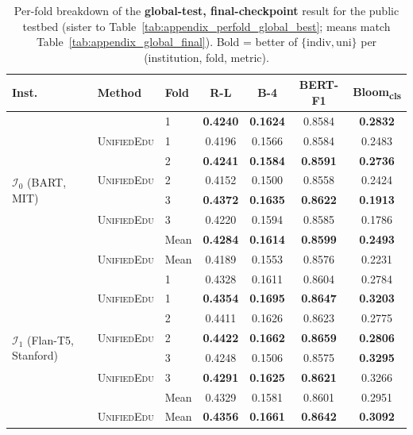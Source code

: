 \documentclass[11pt]{article}
\theoremstyle{plain}
\theoremstyle{definition}
\theoremstyle{remark}
\newcommand{\UniEdu}{\textsc{UnifiedEdu}}
\newcommand{\indiv}{\text{indiv}}
\newcommand{\uni}{\text{uni}}
\begin{document}
\begin{table}[t]
\centering
\footnotesize
\setlength{\tabcolsep}{3pt}
\caption{Per-fold breakdown of the
\textbf{global-test, final-checkpoint} result for
the public testbed (sister to
Table~\ref{tab:appendix_perfold_global_best}; means
match Table~\ref{tab:appendix_global_final}). Bold =
better of $\{\indiv, \uni\}$ per (institution, fold,
metric).}
\label{tab:appendix_perfold_global_final}
\begin{tabular}{ll l cccc}
\toprule
\textbf{Inst.} & \textbf{Method} & \textbf{Fold} &
\textbf{R-L} & \textbf{B-4} & \textbf{BERT-F1} & \textbf{Bloom\textsubscript{cls}} \\
\midrule
\multirow{8}{*}{$\mathcal{I}_0$ (BART, MIT)}
  & \indiv    & 1     & \textbf{0.4240} & \textbf{0.1624} & 0.8584 & \textbf{0.2832} \\
  & \UniEdu{} & 1     & 0.4196 & 0.1566 & 0.8584 & 0.2483 \\
  & \indiv    & 2     & \textbf{0.4241} & \textbf{0.1584} & \textbf{0.8591} & \textbf{0.2736} \\
  & \UniEdu{} & 2     & 0.4152 & 0.1500 & 0.8558 & 0.2424 \\
  & \indiv    & 3     & \textbf{0.4372} & \textbf{0.1635} & \textbf{0.8622} & \textbf{0.1913} \\
  & \UniEdu{} & 3     & 0.4220 & 0.1594 & 0.8585 & 0.1786 \\
  & \indiv    & Mean  & \textbf{0.4284} & \textbf{0.1614} & \textbf{0.8599} & \textbf{0.2493} \\
  & \UniEdu{} & Mean  & 0.4189 & 0.1553 & 0.8576 & 0.2231 \\
\midrule
\multirow{8}{*}{$\mathcal{I}_1$ (Flan-T5, Stanford)}
  & \indiv    & 1     & 0.4328 & 0.1611 & 0.8604 & 0.2784 \\
  & \UniEdu{} & 1     & \textbf{0.4354} & \textbf{0.1695} & \textbf{0.8647} & \textbf{0.3203} \\
  & \indiv    & 2     & 0.4411 & 0.1626 & 0.8623 & 0.2775 \\
  & \UniEdu{} & 2     & \textbf{0.4422} & \textbf{0.1662} & \textbf{0.8659} & \textbf{0.2806} \\
  & \indiv    & 3     & 0.4248 & 0.1506 & 0.8575 & \textbf{0.3295} \\
  & \UniEdu{} & 3     & \textbf{0.4291} & \textbf{0.1625} & \textbf{0.8621} & 0.3266 \\
  & \indiv    & Mean  & 0.4329 & 0.1581 & 0.8601 & 0.2951 \\
  & \UniEdu{} & Mean  & \textbf{0.4356} & \textbf{0.1661} & \textbf{0.8642} & \textbf{0.3092} \\

\end{tabular}
\end{table}
\end{document}
